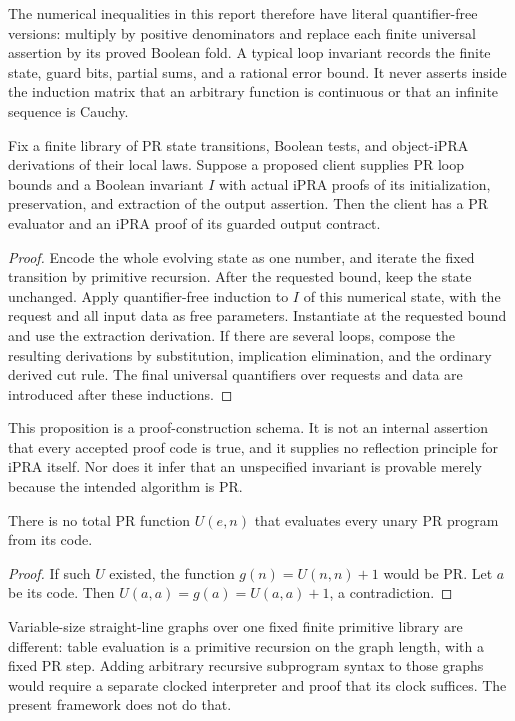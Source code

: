 The numerical inequalities in this report therefore have literal quantifier-free versions: multiply by positive denominators and replace each finite universal assertion by its proved Boolean fold. A typical loop invariant records the finite state, guard bits, partial sums, and a rational error bound. It never asserts inside the induction matrix that an arbitrary function is continuous or that an infinite sequence is Cauchy.

\begin{proposition}\label{prop:compiler}
Fix a finite library of PR state transitions, Boolean tests, and object-iPRA derivations of their local laws. Suppose a proposed client supplies PR loop bounds and a Boolean invariant $I$ with actual iPRA proofs of its initialization, preservation, and extraction of the output assertion. Then the client has a PR evaluator and an iPRA proof of its guarded output contract.
\end{proposition}
\begin{proof}
Encode the whole evolving state as one number, and iterate the fixed transition by primitive recursion. After the requested bound, keep the state unchanged. Apply quantifier-free induction to $I$ of this numerical state, with the request and all input data as free parameters. Instantiate at the requested bound and use the extraction derivation. If there are several loops, compose the resulting derivations by substitution, implication elimination, and the ordinary derived cut rule. The final universal quantifiers over requests and data are introduced after these inductions.
\end{proof}

This proposition is a proof-construction schema. It is not an internal assertion that every accepted proof code is true, and it supplies no reflection principle for iPRA itself. Nor does it infer that an unspecified invariant is provable merely because the intended algorithm is PR.

\begin{lemma}\label{lem:no-eval}
There is no total PR function $U(e,n)$ that evaluates every unary PR program from its code.
\end{lemma}
\begin{proof}
If such $U$ existed, the function $g(n)=U(n,n)+1$ would be PR. Let $a$ be its code. Then $U(a,a)=g(a)=U(a,a)+1$, a contradiction.
\end{proof}
Variable-size straight-line graphs over one fixed finite primitive library are different: table evaluation is a primitive recursion on the graph length, with a fixed PR step. Adding arbitrary recursive subprogram syntax to those graphs would require a separate clocked interpreter and proof that its clock suffices. The present framework does not do that.

